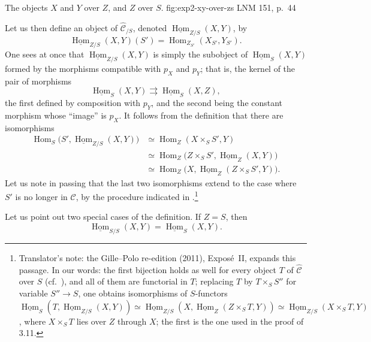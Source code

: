   {The objects \(X\) and \(Y\) over \(Z\), and \(Z\) over \(S\).}
  {fig:exp2-xy-over-zs}
  {LNM 151, p.~44}

%
Let us then define an object of \(\widehat{\mathscr C}_{/S}\), denoted
\(\underline{\operatorname{Hom}}_{Z/S}(X,Y)\), by
\[
  \underline{\operatorname{Hom}}_{Z/S}(X,Y)(S')
  =\operatorname{Hom}_{Z_{S'}}(X_{S'},Y_{S'}).
\]
One sees at once that
\(\underline{\operatorname{Hom}}_{Z/S}(X,Y)\) is simply the subobject of
\(\underline{\operatorname{Hom}}_S(X,Y)\) formed by the morphisms compatible
with \(p_X\) and \(p_Y\); that is, the kernel of the pair of morphisms
\[
  \underline{\operatorname{Hom}}_S(X,Y)
  \rightrightarrows
  \underline{\operatorname{Hom}}_S(X,Z),
\]
the first defined by composition with \(p_Y\), and the second being the
constant morphism whose ``image'' is \(p_X\). It follows from the
definition that there are isomorphisms
\[
\begin{aligned}
  \operatorname{Hom}_S
    \bigl(S',\underline{\operatorname{Hom}}_{Z/S}(X,Y)\bigr)
  &\simeq \operatorname{Hom}_Z(X\times_SS',Y)\\
  &\simeq \operatorname{Hom}_Z\bigl(Z\times_SS',
      \underline{\operatorname{Hom}}_Z(X,Y)\bigr)\\
  &\simeq \operatorname{Hom}_Z\bigl(X,
      \underline{\operatorname{Hom}}_Z(Z\times_SS',Y)\bigr).
\end{aligned}
\]
Let us note in passing that the last two isomorphisms extend to the case
where \(S'\) is no longer in \(\mathscr C\), by the procedure indicated in
.\footnote{Translator's note: the
Gille--Polo re-edition (2011), Expos\'e~II, expands this passage. In our
words: the first bijection holds as well for every object \(T\) of
\(\widehat{\mathscr C}\) over \(S\) (cf.\ ), and all of them are
functorial in \(T\); replacing \(T\) by \(T\times_SS''\) for variable
\(S''\to S\), one obtains isomorphisms of \(S\)-functors
\(\underline{\operatorname{Hom}}_S(T,\underline{\operatorname{Hom}}_{Z/S}(X,Y))
\simeq\underline{\operatorname{Hom}}_{Z/S}(X,\underline{\operatorname{Hom}}_Z(Z\times_ST,Y))
\simeq\underline{\operatorname{Hom}}_{Z/S}(X\times_ST,Y)\), where
\(X\times_ST\) lies over \(Z\) through \(X\); the first is the one used in
the proof of 3.11.}

Let us point out two special cases of the definition. If \(Z=S\), then
\[
  \underline{\operatorname{Hom}}_{S/S}(X,Y)
  =\underline{\operatorname{Hom}}_S(X,Y).
\]

